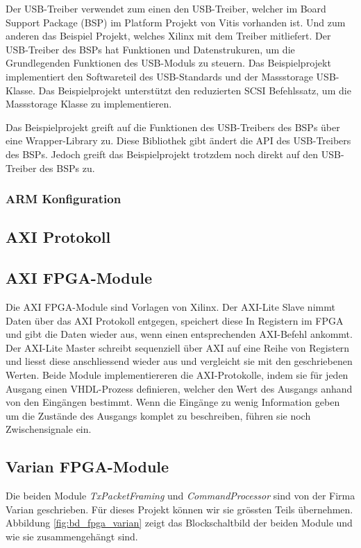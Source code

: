 \documentclass{article}
\begin{document}
Der USB-Treiber verwendet zum einen den USB-Treiber, welcher im Board Support Package (BSP) im Platform Projekt von Vitis vorhanden ist. Und zum anderen das Beispiel Projekt, welches Xilinx mit dem Treiber mitliefert. Der USB-Treiber des BSPs hat Funktionen und Datenstrukuren, um die Grundlegenden Funktionen des USB-Moduls zu steuern. Das Beispielprojekt implementiert den Softwareteil des USB-Standards und der Massstorage USB-Klasse. Das Beispielprojekt unterstützt den reduzierten SCSI Befehlssatz, um die Massstorage Klasse zu implementieren.

Das Beispielprojekt greift auf die Funktionen des USB-Treibers des BSPs über eine Wrapper-Library zu. Diese Bibliothek gibt ändert die API des USB-Treibers des BSPs. Jedoch greift das Beispielprojekt trotzdem noch direkt auf den USB-Treiber des BSPs zu. 
\subsubsection*{ARM Konfiguration}

\subsection{AXI Protokoll}

\subsection{AXI FPGA-Module}
\label{sec:axi}
Die AXI FPGA-Module sind Vorlagen von Xilinx. Der AXI-Lite Slave nimmt Daten über das AXI Protokoll entgegen, speichert diese In Registern im FPGA und gibt die Daten wieder aus, wenn einen entsprechenden AXI-Befehl ankommt. Der AXI-Lite Master schreibt sequenziell über AXI auf eine Reihe von Registern und liesst diese anschliessend wieder aus und vergleicht sie mit den geschriebenen Werten. Beide Module implementiereren die AXI-Protokolle, indem sie für jeden Ausgang einen VHDL-Prozess definieren, welcher den Wert des Ausgangs anhand von den Eingängen bestimmt. Wenn die Eingänge zu wenig Information geben um die Zustände des Ausgangs komplet zu beschreiben, führen sie noch Zwischensignale ein.


\subsection{Varian FPGA-Module}
Die beiden Module \textit{TxPacketFraming} und \textit{CommandProcessor} sind von der Firma Varian geschrieben. Für dieses Projekt können wir sie grössten Teils übernehmen. Abbildung \ref{fig:bd_fpga_varian} zeigt das Blockschaltbild der beiden Module und wie sie zusammengehängt sind.
\end{document}
